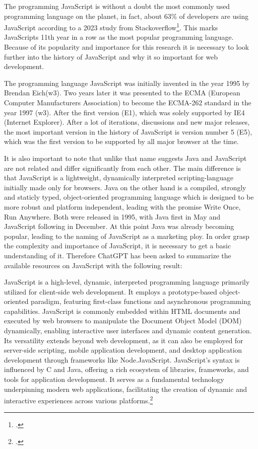 The programming JavaScript is without a doubt the most commonly used programming language on the planet, in fact, about 63\% of developers are using JavaScript according to a 2023 study from Stackoverflow\footcite{stackoverflow_stack_nodate}. This marks JavaScripts 11th year in a row as the most popular programming language. Because of its popularity and importance for this research it is necessary to look further into the history of JavaScript and why it so important for web development.

The programming language JavaScript was initially invented in the year 1995 by Brendan Eich(w3). Two years later it was presented to the ECMA (European Computer Manufacturers Association) to become the ECMA-262 standard in the year 1997 (w3). After the first version (E1), which was solely supported by IE4 (Internet Explorer).
After a lot of iterations, discussions and new major releases, the most important version in the history of JavaScript is version number 5 (E5), which was the first version to be supported by all major browser at the time.

It is also important to note that unlike that name suggests Java and JavaScript are not related and differ significantly from each other.  The main difference is that JavaScript is a lightweight, dynamically interpreted scripting-language initially made only for browsers. Java on the other hand is a compiled, strongly and staticly typed, object-oriented programming language which is designed to be more robust and platform independent, leading with the promise \dq Write Once, Run Anywhere\dq . Both were released in 1995, with Java first in May and JavaScript following in December. At this point Java was already becoming popular, leading to the naming of JavaScript as a marketing ploy.
In order grasp the complexity and importance of JavaScript, it is necessary to get a basic understanding of it. Therefore ChatGPT has been asked to summarize the available resources on JavaScript with the following result:

\dq JavaScript is a high-level, dynamic, interpreted programming language primarily utilized for client-side web development. It employs a prototype-based object-oriented paradigm, featuring first-class functions and asynchronous programming capabilities. JavaScript is commonly embedded within HTML documents and executed by web browsers to manipulate the Document Object Model (DOM) dynamically, enabling interactive user interfaces and dynamic content generation. Its versatility extends beyond web development, as it can also be employed for server-side scripting, mobile application development, and desktop application development through frameworks like Node.JavaScript. JavaScript's syntax is influenced by C and Java, offering a rich ecosystem of libraries, frameworks, and tools for application development. It serves as a fundamental technology underpinning modern web applications, facilitating the creation of dynamic and interactive experiences across various platforms.\dq\footcite{openai_chatgpt_nodate}

